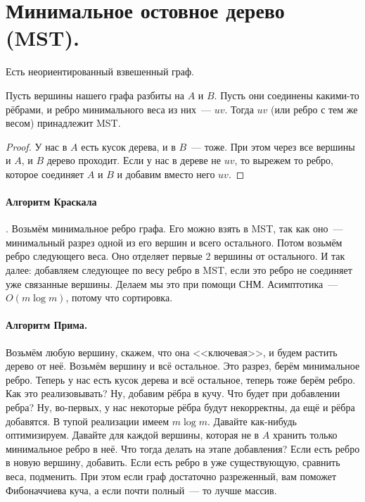 \documentclass{article}
\begin{document}
    \section{Минимальное остовное дерево (MST).}
    Есть неориентированный взвешенный граф.
    \begin{figure}[H]
    \end{figure}
    \begin{lemma}
        Пусть вершины нашего графа разбиты на $A$ и $B$. Пусть они соединены какими-то рёбрами, и ребро минимального веса из них~--- $uv$. Тогда $uv$ (или ребро с тем же весом) принадлежит MST.
    \end{lemma}
    \begin{proof}
        У нас в $A$ есть кусок дерева, и в $B$~--- тоже. При этом через все вершины и $A$, и $B$ дерево проходит. Если у нас в дереве не $uv$, то вырежем то ребро, которое соединяет $A$ и $B$ и добавим вместо него $uv$.
    \end{proof}
    \paragraph{Алгоритм Краскала}.
    Возьмём минимальное ребро графа. Его можно взять в MST, так как оно~--- минимальный разрез одной из его вершин и всего остального. Потом возьмём ребро следующего веса. Оно отделяет первые 2 вершины от остального. И так далее: добавляем следующее по весу ребро в MST, если это ребро не соединяет уже связанные вершины. Делаем мы это при помощи СНМ. Асимптотика~--- $O(m\log m)$, потому что сортировка.
    \paragraph{Алгоритм Прима.}
    Возьмём любую вершину, скажем, что она <<ключевая>>, и будем растить дерево от неё. Возьмём вершину и всё остальное. Это разрез, берём минимальное ребро. Теперь у нас есть кусок дерева и всё остальное, теперь тоже берём ребро. Как это реализовывать? Ну, добавим рёбра в кучу. Что будет при добавлении ребра? Ну, во-первых, у нас некоторые рёбра будут некорректны, да ещё и рёбра добавятся. В тупой реализации имеем $m\log m$. Давайте как-нибудь оптимизируем. Давайте для каждой вершины, которая не в $A$ хранить только минимальное ребро в неё. Что тогда делать на этапе добавления? Если есть ребро в новую вершину, добавить. Если есть ребро в уже существующую, сравнить веса, подменить. При этом если граф достаточно разреженный, вам поможет Фибоначчиева куча, а если почти полный~--- то лучше массив.
\end{document}
